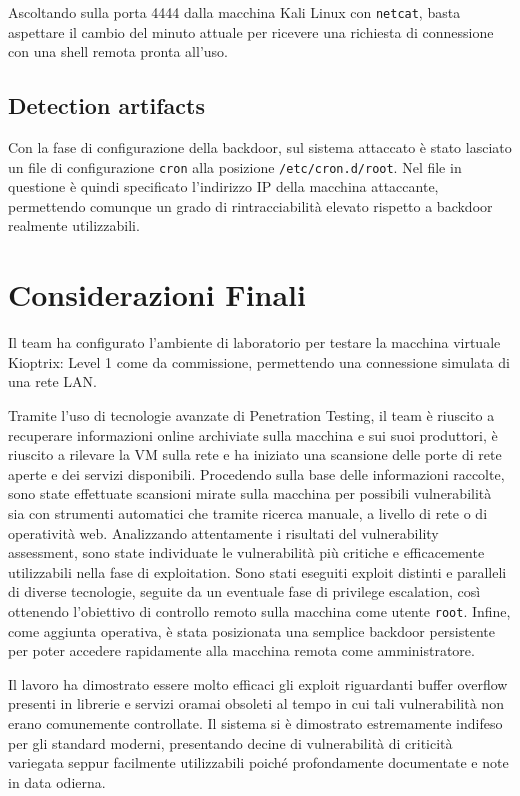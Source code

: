 \documentclass[12pt, a4paper]{article}
\begin{document}
	Ascoltando sulla porta 4444 dalla macchina Kali Linux con \texttt{netcat}, basta aspettare il cambio del minuto attuale per ricevere una richiesta di connessione con una shell remota pronta all'uso.
	
	
	\subsection{Detection artifacts}
	Con la fase di configurazione della backdoor, sul sistema attaccato è stato lasciato un file di configurazione \texttt{cron} alla posizione \texttt{/etc/cron.d/root}. Nel file in questione è quindi specificato l'indirizzo IP della macchina attaccante, permettendo comunque un grado di rintracciabilità elevato rispetto a backdoor realmente utilizzabili.
	
	\section{Considerazioni Finali}
	Il team ha configurato l'ambiente di laboratorio per testare la macchina virtuale Kioptrix: Level 1 come da commissione, permettendo una connessione simulata di una rete LAN.
	
	Tramite l'uso di tecnologie avanzate di Penetration Testing, il team è riuscito a recuperare informazioni online archiviate sulla macchina e sui suoi produttori, è riuscito a rilevare la VM sulla rete e ha iniziato una scansione delle porte di rete aperte e dei servizi disponibili.
	Procedendo sulla base delle informazioni raccolte, sono state effettuate scansioni mirate sulla macchina per possibili vulnerabilità sia con strumenti automatici che tramite ricerca manuale, a livello di rete o di operatività web.
	Analizzando attentamente i risultati del vulnerability assessment, sono state individuate le vulnerabilità più critiche e efficacemente utilizzabili nella fase di exploitation.
	Sono stati eseguiti exploit distinti e paralleli di diverse tecnologie, seguite da un eventuale fase di privilege escalation, così ottenendo l'obiettivo di controllo remoto sulla macchina come utente \texttt{root}.
	Infine, come aggiunta operativa, è stata posizionata una semplice backdoor persistente per poter accedere rapidamente alla macchina remota come amministratore.
	
	Il lavoro ha dimostrato essere molto efficaci gli exploit riguardanti buffer overflow presenti in librerie e servizi oramai obsoleti al tempo in cui tali vulnerabilità non erano comunemente controllate. Il sistema si è dimostrato estremamente indifeso per gli standard moderni, presentando decine di vulnerabilità di criticità variegata seppur facilmente utilizzabili poiché profondamente documentate e note in data odierna.
	
\end{document}
